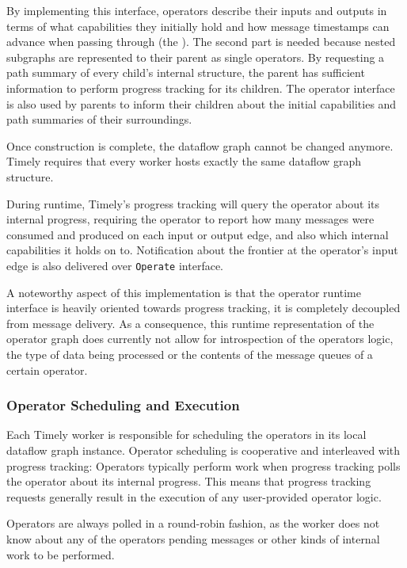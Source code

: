 By implementing this interface, operators describe their inputs and
outputs in terms of what capabilities they initially hold and how message
timestamps can advance when passing through (the ).
The second part is needed because nested subgraphs are represented to their
parent as single operators. By requesting a path summary of every child's
internal structure, the parent has sufficient information to perform progress
tracking for its children. The operator interface is also used by parents
to inform their children about the initial capabilities and path summaries
of their surroundings.

Once construction is complete, the dataflow graph cannot be changed anymore.
Timely requires that every worker hosts exactly the same dataflow graph
structure.

During runtime, Timely's progress tracking will query the operator about its
internal progress, requiring the operator to report how many messages were
consumed and produced on each input or output edge, and also which internal
capabilities it holds on to. Notification about the frontier at the
operator's input edge is also delivered over \lstinline{Operate} interface.

A noteworthy aspect of this implementation is that the operator runtime interface
is heavily oriented towards progress tracking, it is completely decoupled
from message delivery.
As a consequence, this runtime representation of the operator graph does
currently not allow for introspection of the operators logic, the type of data
being processed or the contents of the message queues of a certain operator.

\subsubsection{Operator Scheduling and Execution}

Each Timely worker is responsible for scheduling the operators in its local
dataflow graph instance. Operator scheduling is cooperative and interleaved 
with progress tracking: Operators typically perform work when progress tracking
polls the operator about its internal progress. This means that progress
tracking requests generally result in the execution of any user-provided
operator logic.

Operators are always polled in a round-robin fashion, as the worker does
not know about any of the operators pending messages or other kinds of
internal work to be performed.


